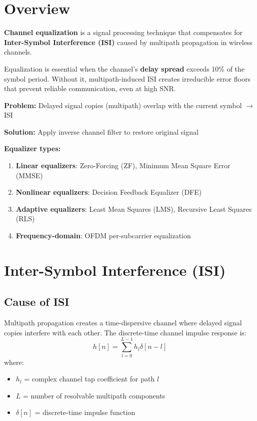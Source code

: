 \section{Overview}

\textbf{Channel equalization} is a signal processing technique that compensates for \textbf{Inter-Symbol Interference (ISI)} caused by multipath propagation in wireless channels.

\begin{keyconcept}
Equalization is essential when the channel's \textbf{delay spread} exceeds 10\% of the symbol period. Without it, multipath-induced ISI creates irreducible error floors that prevent reliable communication, even at high SNR.
\end{keyconcept}

\textbf{Problem:} Delayed signal copies (multipath) overlap with the current symbol $\rightarrow$ ISI

\textbf{Solution:} Apply inverse channel filter to restore original signal

\textbf{Equalizer types:}
\begin{enumerate}
\item \textbf{Linear equalizers}: Zero-Forcing (ZF), Minimum Mean Square Error (MMSE)
\item \textbf{Nonlinear equalizers}: Decision Feedback Equalizer (DFE)
\item \textbf{Adaptive equalizers}: Least Mean Squares (LMS), Recursive Least Squares (RLS)
\item \textbf{Frequency-domain}: OFDM per-subcarrier equalization
\end{enumerate}

\section{Inter-Symbol Interference (ISI)}
\label{sec:isi}

\subsection{Cause of ISI}

Multipath propagation creates a time-dispersive channel where delayed signal copies interfere with each other. The discrete-time channel impulse response is:
\begin{equation}
h[n] = \sum_{l=0}^{L-1} h_l \delta[n - l]
\label{eq:channel-impulse}
\end{equation}
where:
\begin{itemize}
\item $h_l$ = complex channel tap coefficient for path $l$
\item $L$ = number of resolvable multipath components
\item $\delta[n]$ = discrete-time impulse function
\end{itemize}

